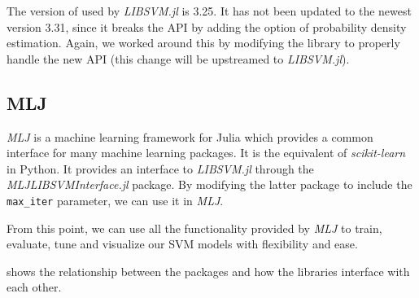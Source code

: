 \subsubsection{}

The version of \libsvm used by \emph{LIBSVM.jl} is 3.25. It has not been
updated to the newest version 3.31, since it breaks the API by adding the option
of probability density estimation. Again, we worked around this by modifying the
library to properly handle the new API (this change will be upstreamed to
\emph{LIBSVM.jl}). %

\subsection{MLJ}

\emph{MLJ} \cite{blaomMLJJuliaPackage2020} is a machine learning framework for
Julia which provides a common interface for many machine learning packages. It
is the equivalent of \emph{scikit-learn} in Python. It provides an interface to
\emph{LIBSVM.jl} through the \emph{MLJLIBSVMInterface.jl} package. By modifying
the latter package to include the \texttt{max\_iter} parameter, we can use it in
\emph{MLJ}.

From this point, we can use all the functionality provided by \emph{MLJ} to
train, evaluate, tune and visualize our SVM models with flexibility and ease.

 shows the relationship between the packages and how
the libraries interface with each other.

